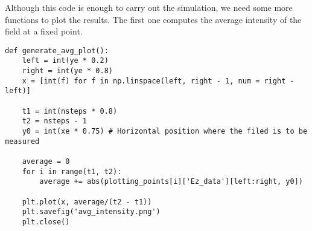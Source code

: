 \documentclass[11pt]{article}
\numberwithin{equation}{section}
\begin{document}
Although this code is enough to carry out the simulation, we need some
more functions to plot the results. The first one computes the average
intensity of the field at a fixed point.
\begin{verbatim}
def generate_avg_plot():
    left = int(ye * 0.2)
    right = int(ye * 0.8)
    x = [int(f) for f in np.linspace(left, right - 1, num = right - left)]           
    
    t1 = int(nsteps * 0.8)
    t2 = nsteps - 1
    y0 = int(xe * 0.75) # Horizontal position where the filed is to be measured
    
    average = 0
    for i in range(t1, t2):
        average += abs(plotting_points[i]['Ez_data'][left:right, y0])
    
    plt.plot(x, average/(t2 - t1))
    plt.savefig('avg_intensity.png')
    plt.close()
\end{verbatim}
\end{document}
